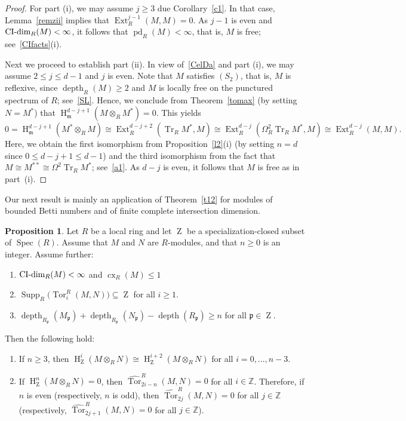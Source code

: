 \documentclass[11pt]{amsart}
\theoremstyle{definition}
\newtheorem{prop}[thm]{Proposition}
\theoremstyle{definition}
\numberwithin{equation}{section}
\newcommand{\fm}{\mathfrak{m}}
\newcommand{\fp}{\mathfrak{p}}
\newcommand{\ZZ}{\mathbb{Z}}
\DeclareMathOperator{\CI}{\textnormal{CI-dim}}
\DeclareMathOperator{\cx}{cx}
\DeclareMathOperator{\Tr}{Tr}
\DeclareMathOperator{\mz}{Z}
\DeclareMathOperator{\depth}{depth}
\DeclareMathOperator{\Ext}{Ext}
\DeclareMathOperator{\hh}{H}
\DeclareMathOperator{\pd}{pd}
\DeclareMathOperator{\Supp}{Supp}
\DeclareMathOperator{\Spec}{Spec}
\DeclareMathOperator{\Tor}{Tor}
\begin{document}
\begin{proof} For part (i), we may assume $j\geq 3$ due Corollary~\ref{c1}. In that case, Lemma~\ref{remzii} implies that $\Ext^{j-1}_R(M,M)=0$. As $j-1$ is even and $\CI_R(M)<\infty$, it follows that $\pd_R(M)<\infty$, that is, $M$ is free; see~\ref{CIfacts}(i).

Next we proceed to establish part (ii). In view of~\ref{CelDa} and part (i), we may assume $2\leq j\leq d-1$ and $j$ is even. Note that $M$ satisfies $(S_2)$, that is, $M$ is reflexive, since $\depth_R(M)\geq 2$ and $M$ is locally free on the punctured spectrum of $R$; see~\ref{SL}. Hence, we conclude from Theorem~\ref{tomax} (by setting $N=M^{\ast}$) that $\hh^{d-j+1}_{\fm}(M\otimes_RM^{\ast})=0$. This yields
$$0=\hh^{d-j+1}_{\fm}(M^{\ast}\otimes_RM)\cong \Ext^{d-j+2}_R(\Tr_RM^{\ast},M)\cong \Ext^{d-j}_R(\Omega^2_R \Tr_RM^{\ast},M) \cong \Ext^{d-j}_R(M,M).$$
Here, we obtain the first isomorphism from Proposition~\ref{l2}(i) (by setting $n=d$ since $0\leq d-j+1\leq d-1$) and the third isomorphism from the fact that $M \cong M^{\ast\ast} \cong \Omega^2\Tr_R M^{\ast}$; see~\ref{a1}. As $d-j$ is even, it follows that $M$ is free as in part~(i).
\end{proof}

Our next result is mainly an application of Theorem~\ref{t12} for modules of bounded Betti numbers and of finite complete intersection dimension.

\begin{prop}\label{cx1} Let $R$ be a local ring and let $\mz$ be a specialization-closed subset of $\Spec(R)$. Assume that $M$ and $N$ are $R$-modules, and that $n\geq 0$ is an integer. Assume further:\begin{enumerate}[\rm(i)]
\item $\CI_R(M)<\infty$ and $\cx_R(M)\leq 1$ 
\item $\Supp_R\big(\Tor_i^R(M,N)\big)\subseteq\mz$ for all $i\geq 1$.  
\item $\depth_{R_\fp}(M_\fp)+\depth_{R_\fp}(N_\fp)-\depth(R_{\fp})\geq n$ for all $\fp\in\mz$.
\end{enumerate}
Then the following hold:
\begin{enumerate}[\rm(a)]
\item If $n\geq3$, then $\hh^i_{\mz}(M\otimes_RN)\cong\hh^{i+2}_{\mz}(M\otimes_RN)$ for all $i=0, \ldots, n-3$. 
\item If $\hh^n_{\mz}(M\otimes_RN)=0$, then $\widehat{\Tor}_{2i-n}^R(M,N)=0$ for all $i\in\ZZ$. Therefore, if $n$ is even (respectively, $n$ is odd), then $\widehat{\Tor}_{2j}^R(M,N)=0$ for all $j\in\ZZ$ (respectively, $\widehat{\Tor}_{2j+1}^R(M,N)=0$ for all $j\in\ZZ$).  
\end{enumerate}	
\end{prop}
\end{document}

